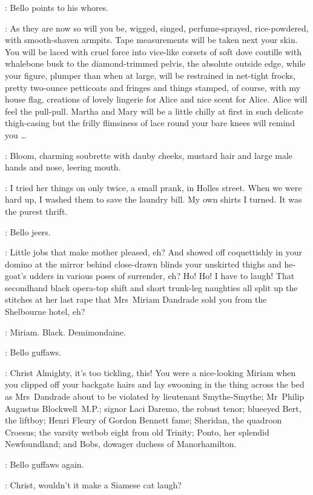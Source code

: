 :
Bello points to his whores.

\Bello:
As they are now so will you be, wigged,
singed, perfume-sprayed, rice-powdered, with smooth-shaven armpits.
Tape measurements will be taken next your skin.
You will be laced with cruel force into vice-like corsets
of soft dove coutille with whalebone busk to the diamond-trimmed pelvis,
the absolute outside edge, while your figure,
plumper than when at large, will be restrained in net-tight frocks,
pretty two-ounce petticoats and fringes and things stamped,
of course, with my house flag,
creations of lovely lingerie for Alice and nice scent for Alice.
Alice will feel the pull-pull.
Martha and Mary will be a little chilly at first
in such delicate thigh-casing but the frilly flimsiness of lace
round your bare knees will remind you \ldots

:
Bloom, charming soubrette with dauby cheeks, mustard hair
and large male hands and nose, leering mouth.

\Bloom:
I tried her things on only twice, a small prank, in Holles street.
When we were hard up, I washed them to save the laundry bill.
My own shirts I turned.
It was the purest thrift.

:
Bello jeers.

\Bello:
Little jobs that make mother pleased, eh?
And showed off coquettishly in your domino at the mirror
behind close-drawn blinds your unskirted thighs and he-goat's udders
in various poses of surrender, eh?
Ho! Ho!
I have to laugh!
That secondhand black opera-top shift and short trunk-leg naughties
all split up the stitches at her last rape
that Mrs~Miriam Dandrade sold you from the Shelbourne hotel, eh?

\Bloom:
Miriam.
Black.
Demimondaine.

:
Bello guffaws.

\Bello:
Christ Almighty, it's too tickling, this!
You were a nice-looking Miriam when you clipped off your backgate hairs
and lay swooning in the thing across the bed as Mrs~Dandrade
about to be violated by lieutenant Smythe-Smythe; Mr~Philip Augustus Blockwell~M.P.;
signor Laci Daremo, the robust tenor; blueeyed Bert, the liftboy;
Henri Fleury of Gordon Bennett fame; Sheridan, the quadroon Croesus;
the varsity wetbob eight from old Trinity; Ponto, her splendid Newfoundland;
and Bobs, dowager duchess of Manorhamilton.

:
Bello guffaws again.

\Bello:
Christ, wouldn't it make a Siamese cat laugh?

